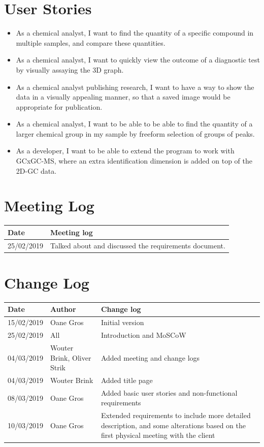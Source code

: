 \documentclass{article}
\begin{document}
\section{User Stories}
\begin{itemize}
	\item As a chemical analyst, I want to find the quantity of a specific compound in multiple samples, and compare these quantities. 
	\item As a chemical analyst, I want to quickly view the outcome of a diagnostic test by visually assaying the 3D graph. 
	\item As a chemical analyst publishing research, I want to have a way to show the data in a visually appealing manner, so that a saved image would be appropriate for publication. 
	\item As a chemical analyst, I want to be able to be able to find the quantity of a larger chemical group in my sample by freeform selection of groups of peaks. 
	\item As a developer, I want to be able to extend the program to work with GCxGC-MS, where an extra identification dimension is added on top of the 2D-GC data. 
\end{itemize}


\section{Meeting Log}
\begin{center}
 \begin{tabular}{ | l | l | }
  \hline
  \bf{Date} & \bf{Meeting log} \\
  \hline
  25/02/2019 & Talked about and discussed the requirements document. \\
  \hline
 \end{tabular}
\end{center}

\section{Change Log}
\begin{center}
 \begin{tabular}{ | l | l | l | }
  \hline
  \bf{Date} & \bf{Author} & \bf{Change log} \\
  \hline
  15/02/2019 & Oane Gros & Initial version \\
  \hline
  25/02/2019 & All & Introduction and MoSCoW \\
  \hline
  04/03/2019 & Wouter Brink, Oliver Strik & Added meeting and change logs\\
  \hline
  04/03/2019 & Wouter Brink & Added title page \\
  \hline
  08/03/2019 & Oane Gros & Added basic user stories and non-functional requirements \\
  \hline
  10/03/2019 & Oane Gros & Extended requirements to include more detailed description, and some alterations based on the first physical meeting with the client \\
  \hline
 \end{tabular}
\end{center}
\end{document}
